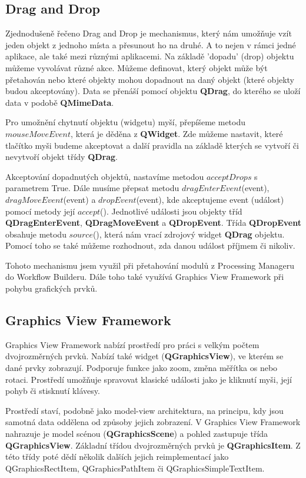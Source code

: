 \subsection{Drag and Drop}
Zjednodušeně řečeno Drag and Drop je mechanismus, který nám umožňuje vzít jeden objekt z jednoho místa a přesunout ho na druhé. A to nejen v rámci jedné aplikace, ale také mezi různými aplikacemi. Na základě 'dopadu' (drop) objektu můžeme vyvolávat různé akce. Můžeme definovat, který objekt může být přetahován nebo které objekty mohou dopadnout na daný objekt (které objekty budou akceptovány). Data se přenáší pomocí objektu \textbf{QDrag}, do kterého se uloží data v podobě \textbf{QMimeData}.

Pro umožnění chytnutí objektu (widgetu) myší, přepíšeme metodu $mouseMoveEvent$, která je děděna z \textbf{QWidget}. Zde můžeme nastavit, které tlačítko myši budeme akceptovat a další pravidla na základě kterých se vytvoří či nevytvoří objekt třídy \textbf{QDrag}. 

Akceptování dopadnutých objektů, nastavíme metodou $acceptDrops$ s parametrem True. Dále musíme přepsat metodu $dragEnterEvent$(event), $dragMoveEvent$(event) a $dropEvent$(event), kde akceptujeme event (událost) pomocí metody její $accept$(). Jednotlivé události jsou objekty tříd \textbf{QDragEnterEvent}, \textbf{QDragMoveEvent} a \textbf{QDropEvent}. Třída \textbf{QDropEvent} obsahuje metodu $source$(), která nám vrací zdrojový widget \textbf{QDrag} objektu. Pomocí toho se také můžeme rozhodnout, zda danou událost příjmem či nikoliv.

Tohoto mechanismu jsem využil při přetahování modulů z Processing Manageru do Workflow Builderu. Dále toho také využívá Graphics View Framework při pohybu grafických prvků.

\subsection{Graphics View Framework}
Graphics View Framework nabízí prostředí pro práci s velkým počtem dvojrozměrných prvků. Nabízí také widget (\textbf{QGraphicsView}), ve kterém se dané prvky zobrazují. Podporuje funkce jako zoom, změna měřítka os nebo rotaci. Prostředí umožňuje spravovat klasické události jako je kliknutí myši, její pohyb či stisknutí klávesy. 

Prostředí staví, podobně jako model-view architektura, na principu, kdy jsou samotná data oddělena od způsoby jejich zobrazení. V Graphics View Framework nahrazuje je model scénou (\textbf{QGraphicsScene}) a pohled zastupuje třída \textbf{QGraphicsView}. Základní třídou dvojrozměrných prvků je \textbf{QGraphicsItem}. Z této třídy poté dědí několik dalších jejich reimplementací jako QGraphicsRectItem, QGraphicsPathItem či QGraphicsSimpleTextItem. 

